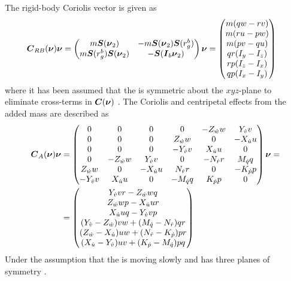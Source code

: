 The rigid-body Coriolis vector is given as
\begin{equation}
\begin{split}
    \boldsymbol{C}_{RB}(\boldsymbol{\nu})\boldsymbol{\nu} &= 
    \begin{pmatrix}
        m\boldsymbol{S}(\boldsymbol{\nu}_2)              & -m\boldsymbol{S}(\boldsymbol{\nu}_2)\boldsymbol{S}(r_g^b)  \\
        m\boldsymbol{S}(r_g^b)\boldsymbol{S}(\boldsymbol{\nu}_2) & -\boldsymbol{S}(\boldsymbol{I}_{b}\boldsymbol{\nu}_2) \\
    \end{pmatrix}
    \boldsymbol{\nu} = 
    \begin{pmatrix}
    m (q w-r v) \\
    m (r u-p w) \\
    m (p v-q u) \\
    q r(I_{y}-I_{z}) \\
    r p(I_{z}-I_{x}) \\
    q p(I_{x}-I_{y}) \\
    \end{pmatrix}
\end{split}
\end{equation}
where it has been assumed that the \abbrROV is symmetric about the $xyz$-plane to eliminate cross-terms in $\boldsymbol{C}(\boldsymbol{\nu})$ \citep[p. 55]{fossen2011}.
The Coriolis and centripetal effects from the added mass are described as
\begin{equation}
\begin{split}
    \boldsymbol{C}_A(\boldsymbol{\nu}) \boldsymbol{\nu} &= 
    \begin{pmatrix}
    0 & 0 & 0 & 0 & -Z_{\dot{w}} w & Y_{\dot{v}} v \\
    0 & 0 & 0 & Z_{\dot{w}} w & 0 & -X_{\dot{u}} u \\
    0 & 0 & 0 & -Y_{\dot{v}} v & X_{\dot{u}} u & 0 \\
    0 & -Z_{\dot{w}} w & Y_{\dot{v}} v & 0 & -N_{\dot{r}} r & M_{\dot{q}} q \\
    Z_{\dot{w}} w & 0 & -X_{\dot{u}} u & N_{\dot{r}} r & 0 & -K_{\dot{p}} p \\
    -Y_{\dot{v}} v & X_{\dot{u}} u & 0 & - M_{\dot{q}} q & K_{\dot{p}} p & 0 \\
    \end{pmatrix}
    \boldsymbol{\nu} = \\ 
    &= \begin{pmatrix}
        Y_{\dot{v}} v r - Z_{\dot{w}} w q\\
        Z_{\dot{w}} w p - X_{\dot{u}} u r\\
        X_{\dot{u}} u q - Y_{\dot{v}} v p \\
        (Y_{\dot{v}} - Z_{\dot{w}}) v w + (M_{\dot{q}} - N_{\dot{r}}) q r\\
        (Z_{\dot{w}} - X_{\dot{u}}) u w + (N_{\dot{r}} - K_{\dot{p}}) p r\\
        (X_{\dot{u}} - Y_{\dot{v}}) u v + (K_{\dot{p}} - M_{\dot{q}}) p q \\
    \end{pmatrix}
\end{split}
\end{equation} Under the assumption that the \abbrROV is moving slowly and has three planes of symmetry \citep[p. 121]{fossen2011}. 

